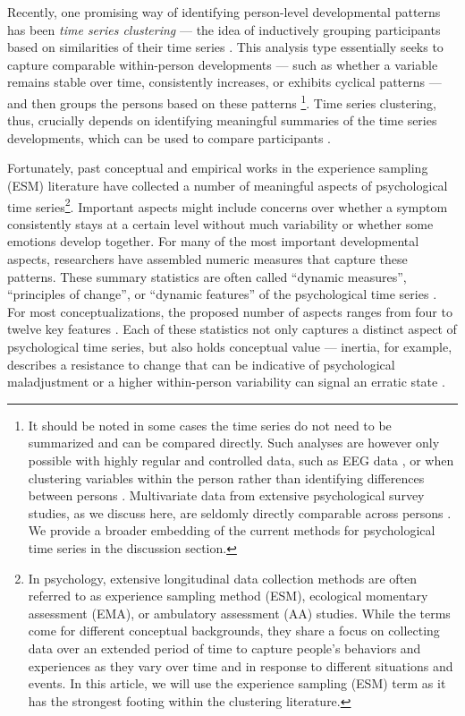 \documentclass[man, 12pt, a4paper, mask, floatsintext]{apa7}
\theoremstyle{break}
\theoremstyle{plain}
\begin{document}
Recently, one promising way of identifying person-level developmental patterns has been \textit{time series clustering} --- the idea of inductively grouping participants based on similarities of their time series \citep{ariens2020}. This analysis type essentially seeks to capture comparable within-person developments --- such as whether a variable remains stable over time, consistently increases, or exhibits cyclical patterns --- and then groups the persons based on these patterns  \citep[][]{liao2005}\footnote{It should be noted in some cases the time series do not need to be summarized and can be compared directly. Such analyses are however only possible with highly regular and controlled data, such as EEG data \citep{huang1985}, or when clustering variables within the person rather than identifying differences between persons \citep{haslbeck2022}. Multivariate data from extensive psychological survey studies, as we discuss here, are seldomly directly comparable across persons \citep[e.g., ][]{faloutsos1994}. We provide a broader embedding of the current methods for psychological time series in the discussion section.}. Time series clustering, thus, crucially depends on identifying meaningful summaries of the time series developments, which can be used to compare participants \citep[][]{Aghabozorgi2015}. 

Fortunately, past conceptual and empirical works in the experience sampling (ESM) literature have collected a number of meaningful aspects of psychological time series\footnote{In psychology, extensive longitudinal data collection methods are often referred to as experience sampling method (ESM), ecological momentary assessment (EMA), or ambulatory assessment (AA) studies. While the terms come for different conceptual backgrounds, they share a focus on collecting data over an extended period of time to capture people's behaviors and experiences as they vary over time and in response to different situations and events. In this article, we will use the experience sampling (ESM) term as it has the strongest footing within the clustering literature.}. Important aspects might include concerns over whether a symptom consistently stays at a certain level without much variability or whether some emotions develop together. For many of the most important developmental aspects, researchers have assembled numeric measures that capture these patterns. These summary statistics are often called ``dynamic measures'', ``principles of change'', or ``dynamic features'' of the psychological time series \citep{dejonckheere2019, kuppens2017, krone2018}. For most conceptualizations, the proposed number of aspects ranges from four to twelve key features \citep[][]{wang2006, dejonckheere2019}. Each of these statistics not only captures a distinct aspect of psychological time series, but also holds conceptual value --- inertia, for example, describes a resistance to change that can be indicative of psychological maladjustment \citep{kuppens2010} or a higher within-person variability can signal an erratic state \citep{myin-germeys2018}.
\end{document}
